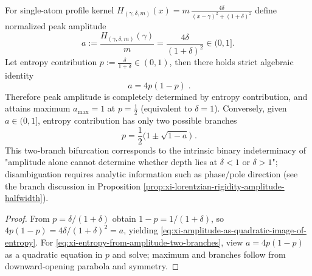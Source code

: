 \begin{corollary}\label{cor:xi-detectability-amplitude-is-quadratic-image}
For single-atom profile kernel
\(
H_{(\gamma,\delta,m)}(x)=m\,\frac{4\delta}{(x-\gamma)^2+(1+\delta)^2}
\)
define normalized peak amplitude
\[
a:=\frac{H_{(\gamma,\delta,m)}(\gamma)}{m}=\frac{4\delta}{(1+\delta)^2}\in(0,1].
\]
Let entropy contribution
\(
p:=\frac{\delta}{1+\delta}\in(0,1)
\), then there holds strict algebraic identity
\begin{equation}\label{eq:xi-amplitude-as-quadratic-image-of-entropy}
\boxed{\;
a=4p(1-p)\; }.
\end{equation}
Therefore peak amplitude is completely determined by entropy contribution, and attains maximum \(a_{\max}=1\) at \(p=\tfrac12\) (equivalent to \(\delta=1\)).
Conversely, given \(a\in(0,1]\), entropy contribution has only two possible branches
\begin{equation}\label{eq:xi-entropy-from-amplitude-two-branches}
\boxed{\;
p=\frac12\bigl(1\pm\sqrt{1-a}\bigr)\; }.
\end{equation}
This two-branch bifurcation corresponds to the intrinsic binary indeterminacy of "amplitude alone cannot determine whether depth lies at \(\delta<1\) or \(\delta>1\)"; disambiguation requires analytic information such as phase/pole direction (see the branch discussion in Proposition \ref{prop:xi-lorentzian-rigidity-amplitude-halfwidth}).
\end{corollary}

\begin{proof}
From \(p=\delta/(1+\delta)\) obtain \(1-p=1/(1+\delta)\), so
\(
4p(1-p)=4\delta/(1+\delta)^2=a
\), yielding \eqref{eq:xi-amplitude-as-quadratic-image-of-entropy}.
For \eqref{eq:xi-entropy-from-amplitude-two-branches}, view \(a=4p(1-p)\) as a quadratic equation in \(p\) and solve; maximum and branches follow from downward-opening parabola and symmetry.
\end{proof}

